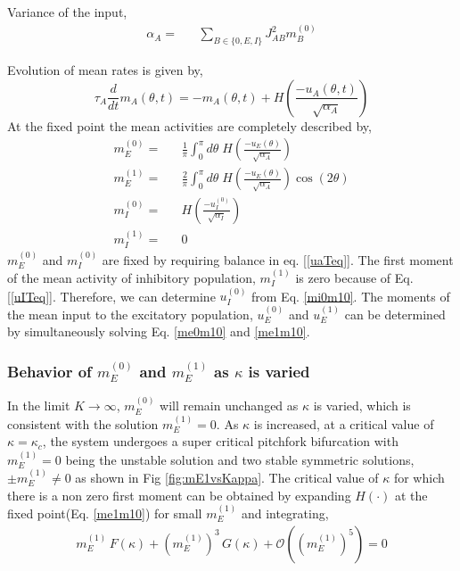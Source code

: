 Variance of the input,\\
\begin{eqnarray}
\alpha_A =&& \sum_{B \in \lbrace 0, E, I\rbrace} J_{AB}^2 m_B^{(0)} \label{alphaE}
\end{eqnarray}

Evolution of mean rates is given by,\\
\begin{equation}
\tau_A \frac{d}{dt} m_A(\theta, t) = -m_A(\theta, t) + H\left( \frac{-u_A(\theta, t)}{\sqrt{\alpha_A}} \right)
\end{equation}
At the fixed point the mean activities are completely described by, \\
\begin{eqnarray}
m_E^{(0)} =&& \frac{1}{\pi} \int_0^\pi d\theta \; H\left( \frac{-u_E(\theta)}{\sqrt{\alpha_A}} \right) \label{me0m10}\\
m_E^{(1)} =&& \frac{2}{\pi} \int_0^\pi d\theta \; H\left( \frac{-u_E(\theta)}{\sqrt{\alpha_A}}  \right) \cos(2 \theta) \label{me1m10} \\
m_I^{(0)} =&&  H\left( \frac{-u^{(0)}_I}{\sqrt{\alpha_I}} \right) \label{mi0m10} \\
m_I^{(1)} =&& 0 
\end{eqnarray}
$m_E^{(0)}$ and $m_I^{(0)}$ are fixed by requiring balance in eq. [\ref{uaTeq}]. The first moment of the mean activity of inhibitory population, $m_I^{(1)}$ is zero because of Eq.[\ref{uITeq}]. Therefore, we can determine $u_I^{(0)}$ from Eq. \ref{mi0m10}. The moments of the mean input to the excitatory population, $u_E^{(0)}$ and $u_E^{(1)}$ can be determined by simultaneously solving Eq. \ref{me0m10} and \ref{me1m10}.
\subsubsection{Behavior of $m_E^{(0)}$ and $m_E^{(1)}$ as $\kappa$ is varied}
In the limit $K \rightarrow \infty$, $m_E^{(0)}$ will remain unchanged as $\kappa$ is varied, which is consistent with the solution $m_E^{(1)} = 0$. As $\kappa$ is increased, at a critical value of $\kappa = \kappa_c$, the system undergoes a super critical pitchfork bifurcation with $m_E^{(1)} = 0$ being the unstable solution and two stable symmetric solutions, $\pm m_E^{(1)} \neq 0$ as shown in Fig \ref{fig:mE1vsKappa}. The critical value of $\kappa$ for which there is a non zero first moment can be obtained by expanding $H(\cdot)$ at the fixed point(Eq. \ref{me1m10}) for small $m_E^{(1)}$ and integrating,
\begin{eqnarray}
m_E^{(1)} \, F(\kappa) + \left( m_E^{(1)} \right)^3 \,  G(\kappa) + \mathcal{O} \left(\left( m_E^{(1)} \right)^5 \right) = 0
\end{eqnarray}

